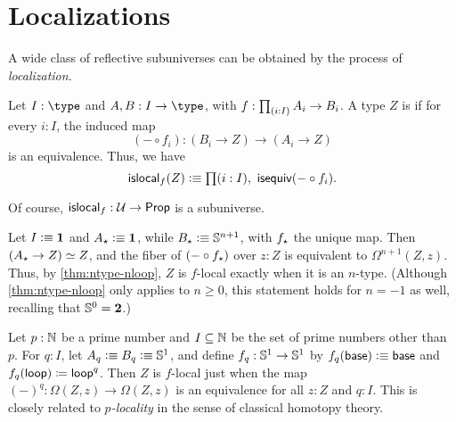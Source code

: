 

\section{Localizations}
\label{sec:localizations}

A wide class of reflective subuniverses can be obtained by the process of \emph{localization}.

\begin{defn}
  Let $I:\type$ and $A,B:I\to\type$, with $f:\prd{i:I} A_i \to B_i$.
  A type $Z$ is  if for every $i:I$, the induced map
  \[ (-\circ f_i) : (B_i \to Z) \to (A_i \to Z) \]
  is an equivalence.
  Thus, we have
  \[ \islocal f (Z) \defeq \prd{i:I} \isequiv(-\circ f_i). \]
\end{defn}

\noindent
Of course, $\mathsf{islocal}_{f}: \mathcal{U}\to \mathsf{Prop}$ is a subuniverse.

\begin{eg}
  Let $I\vcentcolon\equiv\mathbf{1}$ and $A_{\star}\vcentcolon\equiv\mathbf{1}$, while $B_\star\vcentcolon\equiv \mathbb{S}^{n+1}$, with $f_\star$ the unique map.
  Then $(A_\star \to Z) \simeq Z$, and the fiber of $(-\circ f_\star)$ over $z:Z$ is equivalent to $\Omega^{n+1}(Z,z)$.
  Thus, by \autoref{thm:ntype-nloop}, $Z$ is $f$-local exactly when it is an $n$-type.
  (Although \autoref{thm:ntype-nloop} only applies to $n\ge 0$, this statement holds for $n=-1$ as well, recalling that $\mathbb{S}^0 = \mathbf{2}$.)
\end{eg}

\begin{eg}
  Let $p:\mathbb{N}$ be a prime number and $I\subseteq \mathbb{N}$ be the set of prime numbers other than $p$.
  For $q:I$, let $A_q \vcentcolon\equiv B_q \vcentcolon\equiv \mathbb{S}^1$, and define $f_q:\mathbb{S}^1\to\mathbb{S}^1$ by $f_q(\mathsf{base})\vcentcolon\equiv\mathsf{base}$ and ${f_q}({\mathsf{loop}}) \coloneqq \mathsf{loop}^q$.
  Then $Z$ is $f$-local just when the map $(-)^q : \Omega(Z,z) \to \Omega(Z,z)$ is an equivalence for all $z:Z$ and $q:I$.
  This is closely related to \emph{$p$-locality} in the sense of classical homotopy theory.
\end{eg}

